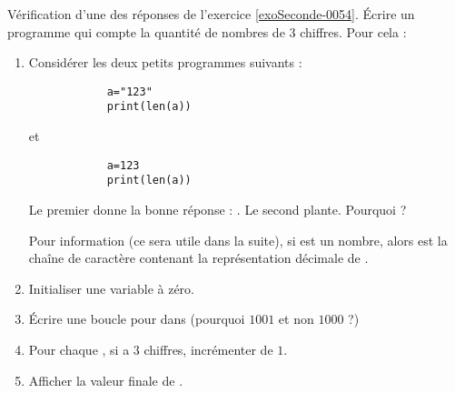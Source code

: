 
\begin{exercice}\label{exoSeconde-0086}

    Vérification d'une des réponses de l'exercice \ref{exoSeconde-0054}. Écrire un programme qui compte la quantité de nombres de \( 3\) chiffres. Pour cela :
    \begin{multicols}{2}
    \begin{enumerate}
        \item
            Considérer les deux petits programmes suivants :
            \begin{verbatim}
            a="123"
            print(len(a))
            \end{verbatim}
            et
            \begin{verbatim}
            a=123
            print(len(a))
            \end{verbatim}
            Le premier donne la bonne réponse : . Le second plante. Pourquoi ?

            Pour information (ce sera utile dans la suite), si  est un nombre, alors  est la chaîne de caractère contenant la représentation décimale de .
        \item
            Initialiser une variable  à zéro.
        \item
            Écrire une boucle pour  dans  (pourquoi \( 1001\) et non \( 1000\) ?)
        \item
            Pour chaque , si  a \( 3\) chiffres, incrémenter  de \( 1\).
        \item
            Afficher la valeur finale de .
    \end{enumerate}
    \end{multicols}

\end{exercice}
